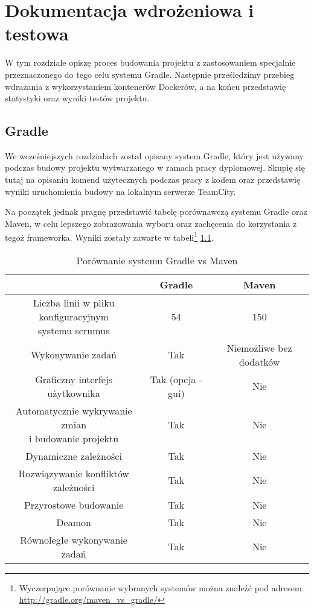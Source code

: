 \chapter{Dokumentacja wdrożeniowa i testowa}
W tym rozdziale opiszę proces budowania projektu z zastosowaniem specjalnie przeznaczonego do tego celu systemu Gradle. Następnie prześledzimy przebieg wdrażania z wykorzystaniem kontenerów Dockerów, a na końcu przedstawię statystyki oraz wyniki testów projektu.

\section{Gradle}
We wcześniejszych rozdziałach został opisany system Gradle, który jest używany podczas budowy projektu wytwarzanego w ramach pracy dyplomowej. Skupię się tutaj na opisaniu komend użytecznych podczas pracy z kodem oraz przedstawię wyniki uruchomienia budowy na lokalnym serwerze TeamCity.

Na początek jednak pragnę przedstawić tabelę porównawczą systemu Gradle oraz Maven, w celu lepszego zobrazowania wyboru oraz zachęcenia do korzystania z tegoż frameworka. Wyniki zostały zawarte w tabeli\footnote{Wyczerpujące porównanie wybranych systemów można znaleźć pod adresem \url{http://gradle.org/maven_vs_gradle/}} \ref{tabela:gradle_vs_maven}.

\begin{table}[h!]
	\caption{Porównanie systemu Gradle vs Maven}
	\centering
	\begin{tabular}{|c|c|c|}
		\hline
		& Gradle & Maven \\
		\hline
		\specialcell{Liczba linii w pliku konfiguracyjnym\\ systemu scrumus} & 54 & 150 \\
		\hline		
		Wykonywanie zadań & Tak & Niemożliwe bez dodatków \\
		\hline		
		Graficzny interfejs użytkownika & Tak (opcja -gui) & Nie \\
		\hline		
		\specialcell{Automatycznie wykrywanie zmian\\ i budowanie projektu} & Tak & Nie \\
		\hline	
		Dynamiczne zależności & Tak & Nie \\
		\hline	
		Rozwiązywanie konfliktów zależności & Tak & Nie \\
		\hline	
		Przyrostowe budowanie & Tak & Nie \\
		\hline	
		Deamon & Tak & Nie \\
		\hline	
		Równoległe wykonywanie zadań & Tak & Nie \\
		\hline	
	\end{tabular}
	\label{tabela:gradle_vs_maven}
\end{table}

